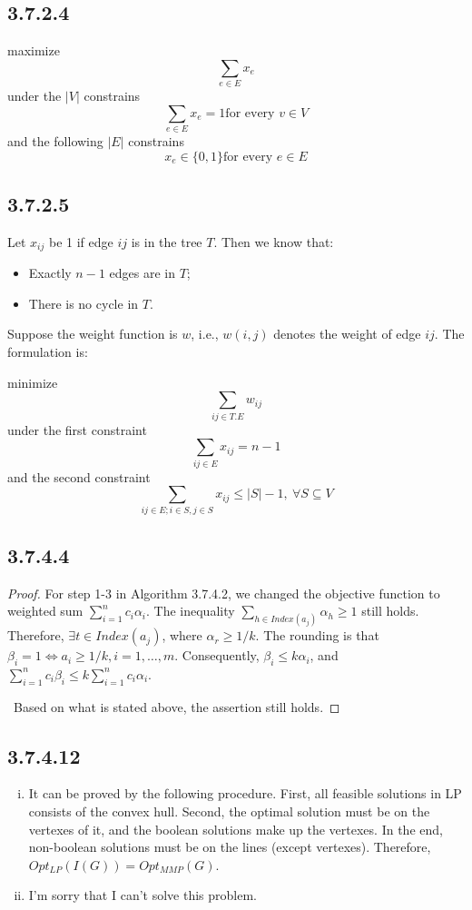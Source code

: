 \documentclass[twocolumn, 10.5pt]{article}
\begin{document}
	\subsection*{3.7.2.4}
	maximize
	\[
	\sum_{e\in E}x_e
	\]
	under the $|V|$ constrains
	\[
	\sum_{e\in E}x_e=1 \text{for every $v\in V$}
	\]
	and the following $|E|$ constrains
	\[
	x_e\in \{0,1\} \text{for every $e\in E$}
	\]
	\subsection*{3.7.2.5}
	Let $x_{ij}$ be 1 if edge $ij$ is in the tree $T$. Then we know that:
	\begin{itemize}
		\item Exactly $n-1$ edges are in $T$;
		\item There is no cycle in $T$.
	\end{itemize}
	Suppose the weight function is $w$, i.e., $w(i,j)$ denotes the weight of edge $ij$. The formulation is:\par 
	minimize
	\[
	\sum_{ij\in T.E}w_{ij}
	\]
	under the first constraint
	\[
	\sum_{ij\in E}x_{ij}=n-1
	\]
	and the second constraint
	\[
	\sum_{ij\in E;i\in S,j\in S}x_{ij}\le |S|-1,\ \forall S\subseteq V
	\]
	\subsection*{3.7.4.4}
	\begin{proof}
		For step 1-3 in Algorithm 3.7.4.2, we changed the objective function to weighted sum $\sum_{i=1}^{n}c_i\alpha_i$. The inequality $\sum_{h\in Index(a_j)}\alpha_h\ge 1$ still holds. Therefore, $\exists t\in Index(a_j)$, where $\alpha_r\ge 1/k$. The rounding is that $\beta_i=1\Leftrightarrow a_i\ge 1/k,i=1,\dots,m$. Consequently, $\beta_i\le k\alpha_i$, and $\sum_{i=1}^{n}c_i\beta_i\le k\sum_{i=1}^{n}c_i\alpha_i$.\par \
		Based on what is stated above, the assertion still holds.
	\end{proof}
	\subsection*{3.7.4.12}
	\begin{enumerate}[(i)]
		\item   It can be proved by the following procedure. First, all feasible solutions in LP consists of the convex hull. Second, the optimal solution must be on the vertexes of it, and the boolean solutions make up the vertexes. In the end, non-boolean solutions must be on the lines (except vertexes). Therefore, $Opt_{LP}(I(G))=Opt_{MMP}(G)$.
		\item 	I'm sorry that I can't solve this problem.
	\end{enumerate}
\end{document}
